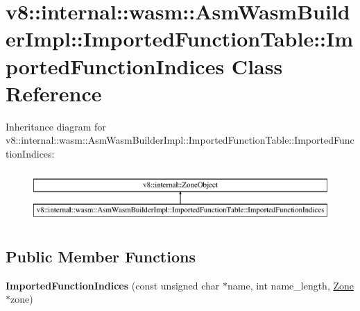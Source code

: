 \hypertarget{classv8_1_1internal_1_1wasm_1_1_asm_wasm_builder_impl_1_1_imported_function_table_1_1_imported_function_indices}{}\section{v8\+:\+:internal\+:\+:wasm\+:\+:Asm\+Wasm\+Builder\+Impl\+:\+:Imported\+Function\+Table\+:\+:Imported\+Function\+Indices Class Reference}
\label{classv8_1_1internal_1_1wasm_1_1_asm_wasm_builder_impl_1_1_imported_function_table_1_1_imported_function_indices}
Inheritance diagram for v8\+:\+:internal\+:\+:wasm\+:\+:Asm\+Wasm\+Builder\+Impl\+:\+:Imported\+Function\+Table\+:\+:Imported\+Function\+Indices\+:\begin{figure}[H]
\begin{center}
\leavevmode
\includegraphics[height=2.000000cm]{classv8_1_1internal_1_1wasm_1_1_asm_wasm_builder_impl_1_1_imported_function_table_1_1_imported_function_indices}
\end{center}
\end{figure}
\subsection*{Public Member Functions}
\begin{DoxyCompactItemize}
\item 
{\bfseries Imported\+Function\+Indices} (const unsigned char $\ast$name, int name\+\_\+length, \hyperlink{classv8_1_1internal_1_1_zone}{Zone} $\ast$zone)\hypertarget{classv8_1_1internal_1_1wasm_1_1_asm_wasm_builder_impl_1_1_imported_function_table_1_1_imported_function_indices_a9b66e5e4b2d2f49601743eda04305bb3}{}\label{classv8_1_1internal_1_1wasm_1_1_asm_wasm_builder_impl_1_1_imported_function_table_1_1_imported_function_indices_a9b66e5e4b2d2f49601743eda04305bb3}

\end{DoxyCompactItemize}
